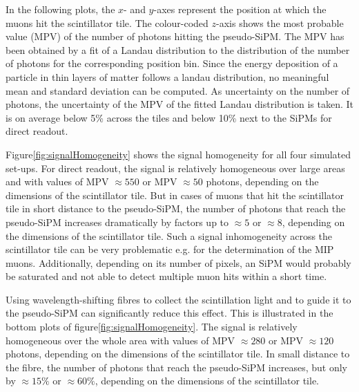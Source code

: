 In the following plots, the $x$- and $y$-axes represent the position at which the muons hit the scintillator tile. The colour-coded $z$-axis shows the most probable value (MPV) of the number of photons hitting the pseudo-SiPM. The MPV has been obtained by a fit of a Landau distribution to the distribution of the number of photons for the corresponding position bin. Since the energy deposition of a particle in thin layers of matter follows a landau distribution, no meaningful mean and standard deviation can be computed. As uncertainty on the number of photons, the uncertainty of the MPV of the fitted Landau distribution is taken. It is on average below 5\% across the tiles and below 10\% next to the SiPMs for direct readout.

Figure\enspace\ref{fig:signalHomogeneity} shows the signal homogeneity for all four simulated set-ups. For direct readout, the signal is relatively homogeneous over large areas and with values of MPV $\approx 550$ or MPV $\approx 50$ photons, depending on the dimensions of the scintillator tile. But in cases of muons that hit the scintillator tile in short distance to the pseudo-SiPM, the number of photons that reach the pseudo-SiPM increases dramatically by factors up to $\approx 5$ or $\approx 8$, depending on the dimensions of the scintillator tile. Such a signal inhomogeneity across the scintillator tile can be very problematic e.g. for the determination of the MIP muons. Additionally, depending on its number of pixels, an SiPM would probably be saturated and not able to detect multiple muon hits within a short time.

Using wavelength-shifting fibres to collect the scintillation light and to guide it to the pseudo-SiPM can significantly reduce this effect. This is illustrated in the bottom plots of figure\enspace\ref{fig:signalHomogeneity}. 
The signal is relatively homogeneous over the whole area with values of MPV $\approx 280$ or MPV $\approx 120$ photons, depending on the dimensions of the scintillator tile. In small distance to the fibre, the number of photons that reach the pseudo-SiPM increases, but only by $\approx 15\%$ or $\approx 60\%$, depending on the dimensions of the scintillator tile.

